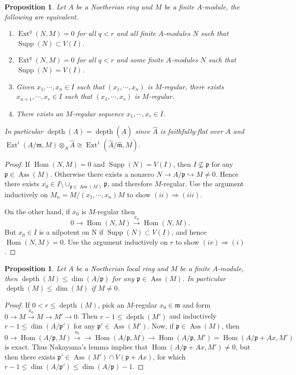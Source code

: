 \documentclass[leqno]{amsart}
\DeclareMathOperator{\Supp}{Supp}
\DeclareMathOperator{\Ass}{Ass}
\DeclareMathOperator{\depth}{depth}
\newcommand{\1}{\mathbf{1}}
\newcommand{\fm}{\mathfrak m}
\newcommand{\fp}{\mathfrak p}
\DeclareMathOperator{\Ext}{Ext}
\DeclareMathOperator{\Hom}{Hom}
\newtheorem{prop}[thm]{Proposition}
\theoremstyle{definition}
\theoremstyle{remark}
\begin{document}
\begin{prop}
	Let $A$ be a Noetherian ring and $M$ be a finite $A$-module, the following are equivalent.
	\begin{enumerate}
	\item 
	$\Ext^q(N,M)=0$ for all $q<r$ and all 
	finite $A$-modules $N$ such that $\Supp(N)\subset V(I)$.
	\item 
	$\Ext^q(N,M)=0$ for all $q<r$ and some 
	finite $A$-modules $N$ such that $\Supp(N)=V(I)$.
	\item 
	Given $x_1,\cdots,x_n\in I$ such that
	$(x_1,\cdots,x_n)$ is $M$-regular,
	there exists $x_{n+1},\cdots,x_r\in I$ such that 
	$(x_1,\cdots,x_r)$ is $M$-regular.
	\item 
	There exists an $M$-regular sequence $x_1,\cdots,x_r\in I$.
	\end{enumerate}
	In particular
	$\depth(A)=\depth(\hat{A})$
	since $\hat{A}$ is faithfully-flat over $A$
	and $\Ext^i(A/\fm, M)\otimes_A\hat{A}\cong
	\Ext^1(\hat{A}/\hat{\fm}, \hat{M})$.
\end{prop}
\begin{proof}
	If $\Hom(N,M)=0$ and $\Supp(N)=V(I)$,
	then $I\nsubseteq \fp$ for any  $\fp\in \Ass(M)$.
	Otherwise there exists a nonzero
	$N\to A/\fp\hookrightarrow M\neq 0$.
	Hence there exists $x_0\in I\setminus \cup_{\fp\in\Ass(M)}\fp$,
	and therefore $M$-regular.
	Use the argument inductively on 
	$M_n=M/(x_1,\cdots,x_n)M$ 
	to show $(ii)\Longrightarrow(iii)$.

	On the other hand, if $x_0$ is  $M$-regular then
	\[
		0\to \Hom(N,M)\xrightarrow{x_0}\Hom(N,M).
	\]
	But $x_0\in I$ is a nilpotent on N 
	if $\Supp(N)\subset V(I)$, and hence $\Hom(N,M)=0$.
	Use the argument inductively on $r$
	to show  $(iv)\Longrightarrow (i)$. 
\end{proof}

\begin{prop}
	Let $A$ be a Noetherian local ring and 
	$M$ be a finite $A$-module, 
	then $\depth(M)\leq \dim(A/\fp)$ for any  $\fp\in \Ass(M)$. 
	In particular  $\depth(M)\leq \dim(M)$ if  $M\neq 0$.
\end{prop}
\begin{proof}
	If $0<r\leq \depth(M)$, pick an  $M$-regular $x_0\in \fm$
	and form $0\to M\xrightarrow{x_0}M\to M'\to 0$.
	Then $r-1\leq \depth(M')$ and inductively
	$r-1\leq \dim(A/\fp')$ for any  $\fp'\in \Ass(M')$.
	Now, if  $\fp\in \Ass(M)$, then 
	 \[
		 0\to \Hom(A/\fp,M)\xrightarrow{x_0}
		 \to \Hom(A/\fp,M) \to 
		 \Hom(A/\fp,M')=\Hom(A/\fp+Ax, M')
	\]
	is exact. Thus Nakayama's lemma implies that 
	$\Hom(A/\fp+Ax,M')\neq 0$,
	but then there exists  $\fp'\in \Ass(M')\cap V(\fp+Ax)$,
	for which $r-1\leq \dim(A/\fp')\leq \dim(A/\fp)-1$. 
\end{proof}
\end{document}
